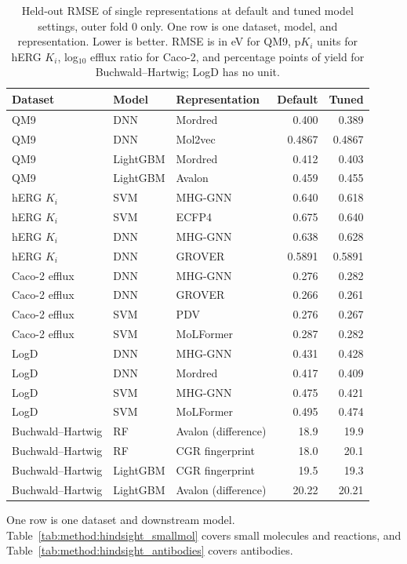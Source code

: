 \begin{table}[htbp]
\centering
\caption[Default and tuned model settings on single representations.]{Held-out RMSE of single representations at default and tuned model settings, outer fold 0 only. One row is one dataset, model, and representation. Lower is better. RMSE is in eV for QM9, p$K_i$ units for hERG $K_i$, log$_{10}$ efflux ratio for Caco-2, and percentage points of yield for Buchwald--Hartwig; LogD has no unit.}
\label{tab:tuning_base_reps}
\begin{tabular}{lllrr}
\toprule
Dataset & Model & Representation & Default & Tuned \\
\midrule
QM9 & DNN & Mordred & 0.400 & 0.389 \\
QM9 & DNN & Mol2vec & 0.4867 & 0.4867 \\
QM9 & LightGBM & Mordred & 0.412 & 0.403 \\
QM9 & LightGBM & Avalon & 0.459 & 0.455 \\
hERG $K_i$ & SVM & MHG-GNN & 0.640 & 0.618 \\
hERG $K_i$ & SVM & ECFP4 & 0.675 & 0.640 \\
hERG $K_i$ & DNN & MHG-GNN & 0.638 & 0.628 \\
hERG $K_i$ & DNN & GROVER & 0.5891 & 0.5891 \\
Caco-2 efflux & DNN & MHG-GNN & 0.276 & 0.282 \\
Caco-2 efflux & DNN & GROVER & 0.266 & 0.261 \\
Caco-2 efflux & SVM & PDV & 0.276 & 0.267 \\
Caco-2 efflux & SVM & MoLFormer & 0.287 & 0.282 \\
LogD & DNN & MHG-GNN & 0.431 & 0.428 \\
LogD & DNN & Mordred & 0.417 & 0.409 \\
LogD & SVM & MHG-GNN & 0.475 & 0.421 \\
LogD & SVM & MoLFormer & 0.495 & 0.474 \\
Buchwald--Hartwig & RF & Avalon (difference) & 18.9 & 19.9 \\
Buchwald--Hartwig & RF & CGR fingerprint & 18.0 & 20.1 \\
Buchwald--Hartwig & LightGBM & CGR fingerprint & 19.5 & 19.3 \\
Buchwald--Hartwig & LightGBM & Avalon (difference) & 20.22 & 20.21 \\
\bottomrule
\end{tabular}
\end{table}

\label{app:add:hindsight_shuffle}
One row is one dataset and downstream model. Table~\ref{tab:method:hindsight_smallmol} covers small molecules and reactions, and Table~\ref{tab:method:hindsight_antibodies} covers antibodies.

